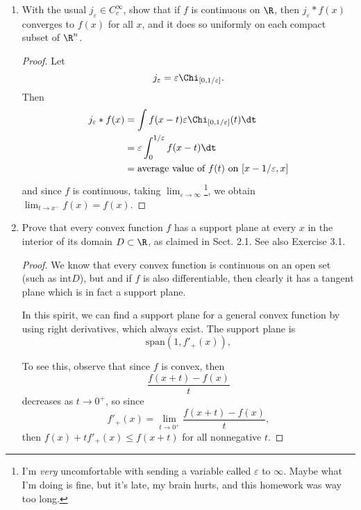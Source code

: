 \documentclass[12pt,letterpaper]{article}
\renewcommand{\epsilon}{\varepsilon}
\begin{document}
\begin{enumerate}
\begin{enumerate}
\begin{proof}
	As regards weak convergence, I think we can approximate with compact supported functions and use Dominated Convergence to yield the result. Intuitively, $g(x+k)$ aught to get small as $k\to\infty$, and multiplying by the fixed number $h(x)$ won't stop the small-enizing. As to the details, I ran out of time. This homework was too long. 
	\end{proof}
	\end{enumerate}

\setcounter{enumi}{10}
\item With the usual $j_\epsilon \in C^\infty_c$, show that if $f$ is continuous on $\R$, then $j_\epsilon*f(x)$ converges to $f(x)$ for all $x$, and it does so uniformly on each compact subset of $\R^n$. 
\begin{proof}
Let 
$$j_\epsilon = \epsilon\Chi_{[0,1/\epsilon]}.$$
Then 
\begin{align*}
j_\epsilon*f(x)&=\int f(x-t)\epsilon\Chi_{[0,1/\epsilon]}(t)\dt \\
&=\epsilon\int_0^{1/\epsilon} f(x-t)\dt \\
&=\text{average value of }f(t)\text{ on }[x-1/\epsilon,x]
\end{align*}
and since $f$ is continuous, taking $\lim_{\epsilon\to\infty}$\footnote{I'm \emph{very} uncomfortable with sending a variable called $\epsilon$ to $\infty$. Maybe what I'm doing is fine, but it's late, my brain hurts, and this homework was way too long.}, we obtain $\lim_{t\to x^-}f(x)=f(x)$.  
\end{proof}

\setcounter{enumi}{17} 
\item Prove that every convex function $f$ has a support plane at every $x$ in the interior of its domain $D\subset\R$, as claimed in Sect. 2.1. See also Exercise 3.1.

\begin{proof}
We know that every convex function is continuous on an open set (such as $\text{int} D$), but and if $f$ is also differentiable, then clearly it has a tangent plane which is in fact a support plane. 

In this spirit, we can find a support plane for a general convex function by using right derivatives, which always exist. %
The support plane is 
$$\text{span}(1,f'_+(x)),$$

To see this, observe that since $f$ is convex, then 
$$\frac{f(x+t)-f(x)}{t}$$
decreases as $t\to0^+$, so since
$$f'_+(x)=\lim_{t\to0^+}\frac{f(x+t)-f(x)}{t},$$
then $f(x)+tf'_+(x)\leq f(x+t)$ for all nonnegative $t$. 


\end{proof}
\end{enumerate}
\end{document}
